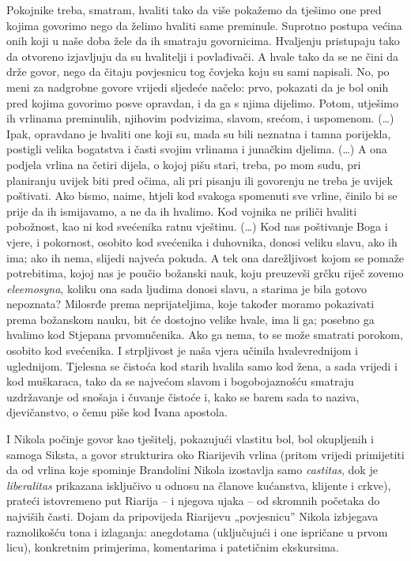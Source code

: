 \documentclass[a5paper,twoside]{article}
\renewenvironment{quote}
               {\list{}{\rightmargin 0mm
                \leftmargin 7mm
                \itemindent 0em}%
                \item\relax}
               {\endlist}
\begin{document}
\begin{quote}
Pokojnike treba, smatram, hvaliti tako da više pokažemo da tješimo one pred kojima govorimo nego da želimo hvaliti same preminule. Suprotno postupa većina onih koji u naše doba žele da ih smatraju govornicima. Hvaljenju pristupaju tako da otvoreno izjavljuju da su hvalitelji i povlađivači. A hvale tako da se ne čini da drže govor, nego da čitaju povjesnicu tog čovjeka koju su sami napisali. No, po meni za nadgrobne govore vrijedi sljedeće načelo: prvo, pokazati da je bol onih pred kojima govorimo posve opravdan, i da ga s njima dijelimo. Potom, utješimo ih vrlinama preminulih, njihovim podvizima, slavom, srećom, i uspomenom. (\dots) Ipak, opravdano je hvaliti one koji su, mada su bili neznatna i tamna porijekla, postigli velika bogatstva i časti svojim vrlinama i junačkim djelima. (\dots) A ona podjela vrlina na četiri dijela, o kojoj pišu stari, treba, po mom sudu, pri planiranju uvijek biti pred očima, ali pri pisanju ili govorenju ne treba je uvijek poštivati. Ako bismo, naime, htjeli kod svakoga spomenuti sve vrline, činilo bi se prije da ih ismijavamo, a ne da ih hvalimo. Kod vojnika ne priliči hvaliti pobožnost, kao ni kod svećenika ratnu vještinu. (\dots) Kod nas poštivanje Boga i vjere, i pokornost, osobito kod svećenika i duhovnika, donosi veliku slavu, ako ih ima; ako ih nema, slijedi najveća pokuda. A tek ona darežljivost kojom se pomaže potrebitima, kojoj nas je poučio božanski nauk, koju preuzevši grčku riječ zovemo \textit{eleemosyna}, koliku ona sada ljudima donosi slavu, a starima je bila gotovo nepoznata? Milosrđe prema neprijateljima, koje također moramo pokazivati prema božanskom nauku, bit će dostojno velike hvale, ima li ga; posebno ga hvalimo kod Stjepana prvomučenika. Ako ga nema, to se može smatrati porokom, osobito kod svećenika. I strpljivost je naša vjera učinila hvalevrednijom i uglednijom. Tjelesna se čistoća kod starih hvalila samo kod žena, a sada vrijedi i kod muškaraca, tako da se najvećom slavom i bogobojaznošću smatraju uzdržavanje od snošaja i čuvanje čistoće i, kako se barem sada to naziva, djevičanstvo, o čemu piše kod Ivana apostola.
\end{quote}

I Nikola počinje govor kao tješitelj, pokazujući vlastitu bol, bol okupljenih i samoga Siksta, a govor strukturira oko Riarijevih vrlina (pritom vrijedi primijetiti da od vrlina koje spominje Brandolini Nikola izostavlja samo \textit{castitas}, dok je \textit{liberalitas} prikazana isključivo u odnosu na članove kućanstva, klijente i crkve), prateći istovremeno put Riarija – i njegova ujaka – od skromnih početaka do najviših časti. Dojam da pripovijeda Riarijevu „povjesnicu” Nikola izbjegava raznolikošću tona i izlaganja: anegdotama (uključujući i one ispričane u prvom licu), konkretnim primjerima, komentarima i patetičnim ekskursima. 
\end{document}
